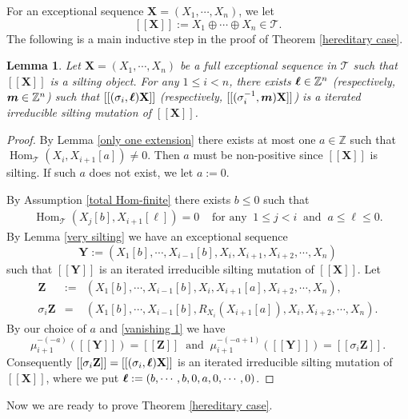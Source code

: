 \documentclass[a4paper,reqno]{amsart}
\newtheorem{lemma}[theorem]{Lemma}
\theoremstyle{definition}
\newcommand{\TT}{{\mathcal T}}
\newcommand{\Z}{\mathbb{Z}}
\newcommand{\Hom}{\operatorname{Hom}\nolimits}
\begin{document}
For an exceptional sequence ${\mathbf X}=(X_1,\cdots,X_n)$, we let
\[[[{\mathbf X}]]:=X_1\oplus\cdots\oplus X_n\in\TT.\]
The following is a main inductive step in the proof of Theorem \ref{hereditary case}.

\begin{lemma}\label{exceptional mutation by silting mutation}
Let ${\mathbf X}=(X_1,\cdots,X_n)$ be a full exceptional sequence in $\TT$
such that $[[{\mathbf X}]]$ is a silting object.
For any $1\le i<n$, there exists $\mbox{\boldmath $\ell$}\in\Z^n$ (respectively, $\mbox{\boldmath $m$}\in\Z^n$) such that
$[[(\sigma_i,\mbox{\boldmath $\ell $}){\mathbf X}]]$ (respectively, $[[(\sigma_i^{-1},\mbox{\boldmath $m$}){\mathbf X}]]$)
is a iterated irreducible silting mutation of $[[{\mathbf X}]]$.
\end{lemma}

\begin{proof}
By Lemma \ref{only one extension} there exists at most one
$a\in\Z$ such that $\Hom_{\TT}(X_i,X_{i+1}[a])\neq0$.
Then $a$ must be non-positive since $[[{\mathbf X}]]$ is silting.
If such $a$ does not exist, we let $a:=0$.

By Assumption \ref{total Hom-finite} there exists $b\le0$ such that
\begin{eqnarray}\label{vanishing 1}
\Hom_{\TT}(X_j[b],X_{i+1}[\ell])=0&\mbox{ for any }\ 1\le j<i\ \mbox{ and }\ a\le\ell\le0.
\end{eqnarray}
By Lemma \ref{very silting} we have an exceptional sequence
\[{\mathbf Y}:=(X_1[b],\cdots,X_{i-1}[b],X_i,X_{i+1},X_{i+2},\cdots,X_n)\]
such that $[[{\mathbf Y}]]$ is an iterated irreducible silting mutation of $[[{\mathbf X}]]$.
Let
\begin{eqnarray*}
{\mathbf Z}&:=&(X_1[b],\cdots,X_{i-1}[b],X_i,X_{i+1}[a],X_{i+2},\cdots,X_n),\\
\sigma_i{\mathbf Z}&=&(X_1[b],\cdots,X_{i-1}[b],R_{X_i}(X_{i+1}[a]),X_i,X_{i+2},\cdots,X_n).
\end{eqnarray*}
By our choice of $a$ and \eqref{vanishing 1} we have
\[\mu_{i+1}^{-(-a)}([[{\mathbf Y}]])=[[{\mathbf Z}]]\ \mbox{ and }\ \mu_{i+1}^{-(-a+1)}([[{\mathbf Y}]])=[[\sigma_i{\mathbf Z}]].\]
Consequently $[[\sigma_i{\mathbf Z}]]=[[(\sigma_i,\mbox{\boldmath $\ell$}){\mathbf X}]]$
is an iterated irreducible silting mutation of $[[{\mathbf X}]]$,
where we put $\mbox{\boldmath $\ell$}:=(b,\cdots,b,0,a,0,\cdots,0)$.
\end{proof}

Now we are ready to prove Theorem \ref{hereditary case}.
\end{document}
